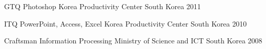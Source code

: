 

\begin{cvhonors}

  \cvhonor
    {GTQ Photoshop} %
    {Korea Productivity Center} %
    {South Korea} %
    {2011} %

  \cvhonor
    {ITQ PowerPoint, Access, Excel} %
    {Korea Productivity Center} %
    {South Korea} %
    {2010} %

  \cvhonor
    {Craftsman Information Processing} %
    {Ministry of Science and ICT} %
    {South Korea} %
    {2008} %

\end{cvhonors}





